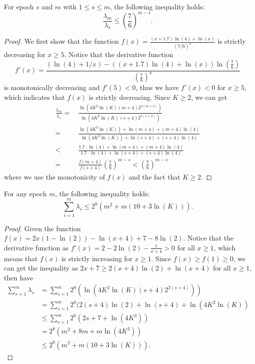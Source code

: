 \begin{lemma}
\label{lem:trl}    %
    For epoch $s$ and $m$ with $1\le s \leq m$, the following inequality holds:
    \[\frac{\lambda_m}{\lambda_s} \leq \left(\frac{7}{6}\right)^{m-s}.\]
\end{lemma}
\begin{proof}
    We first show that the function $f(x)=\frac{(x+1.7)\ln(4)+\ln(x)}{(7/6)^x}$
    is strictly decreasing for $x\ge 5$.
    Notice that the derivative function \[f'(x)=\frac{(\ln(4)+1/x)-((x+1.7)\ln(4)+\ln(x))\ln\left(\frac{7}{6}\right)}{\left(\frac{7}{6}\right)^{x}}\]
    is monotonically decreasing and $f'(5)<0$, thus we have $f'(x)<0$ for $x\ge 5$, which indicates that $f(x)$ is strictly decreasing.
    Since $K\ge 2$, we can get
    \begin{align*}
    \frac{\lambda_m}{\lambda_s}=&\, \frac{\ln(4K^2\ln(K)(m+4)2^{2(m+4)})}{\ln(4K^2\ln(K)(s+4)2^{2(s+4)})}\\
    =& \,\frac{\ln(4K^2\ln(K))+\ln(m+4)+(m+4)\ln(4)}{\ln(4K^2\ln(K))+\ln(s+4)+(s+4)\ln(4)}\\
    <& \,\frac{1.7\cdot\ln(4)+\ln(m+4)+(m+4)\ln(4)}{1.7\cdot\ln(4)+\ln(s+4)+(s+4)\ln(4)}\\
    =&\,\frac{f(m+4)}{f(s+4)}\left(\frac{7}{6}\right)^{m-s}<\left(\frac{7}{6}\right)^{m-s}
    \end{align*}
where we use the monotonicity of $f(x)$ and the fact that $K\ge 2$.
\end{proof}

\begin{lemma}
\label{lem:tsl}     %
    For any epoch $m$, the following inequality holds:
    \[\sum_{s=1}^{m} \lambda_s \leq 2^8(m^2 + m(10+3\ln(K))).\]
\end{lemma}
\begin{proof}
    Given the function $f(x) = 2x(1-\ln(2)) - \ln(x+4) + 7 - 8\ln(2)$. Notice that the derivative function as $f'(x) = 2 - 2\ln(2) - \frac{1}{x+4} > 0$ for all $x \geq 1$, which means that $f(x)$ is strictly increasing for $x \geq 1$. Since $f(x) \geq f(1) \geq 0$, we can get the inequality as $2x + 7 \geq 2(x+4)\ln(2) + \ln(x+4)$ for all $x \geq 1$, then have
    \begin{align*}
        \sum_{s=1}^{m} \lambda_s &= \sum_{s=1}^{m} 2^8(\ln(4K^2\ln(K)(s+4)2^{2(s+4)})) \\
        &= \sum_{s=1}^{m} 2^8(2(s+4)\ln(2) + \ln(s+4) + \ln(4K^2\ln(K)) \\
        &\leq \sum_{s=1}^{m} 2^8(2s + 7 + \ln(4K^3)) \\
        &= 2^8(m^2 + 8m + m\ln(4K^3)) \\
        &\leq 2^8(m^2 + m(10+3\ln(K))).
    \end{align*}
\end{proof}


